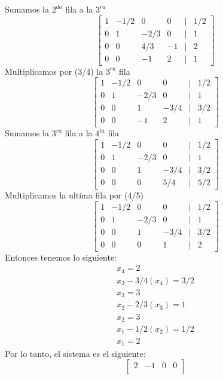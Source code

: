 \begin{itemize}
\[  			\]
  			Sumamos la $2^{da}$ fila a la $3^{ra}$
  			\[
  			\begin{bmatrix}
   			 1 & -1/2 & 0 & 0 & | & 1/2 \\ 
    		 0 & 1 & -2/3 & 0 & | & 1\\
    		 0 & 0 & 4/3 & -1 & | & 2 \\
    		 0 & 0 & -1 & 2 & | & 1 
  			\end{bmatrix}
  			\]
  			Multiplicamos por (3/4) la $3^{ra}$ fila 
			\[
  			\begin{bmatrix}
   			 1 & -1/2 & 0 & 0 & | & 1/2 \\ 
    		 0 & 1 & -2/3 & 0 & | & 1\\
    		 0 & 0 & 1 & -3/4 & | & 3/2 \\
    		 0 & 0 & -1 & 2 & | & 1 
  			\end{bmatrix}
  			\]	
  			Sumamos la $3^{ra}$ fila a la $4^{ta}$ fila 
  			\[
  			\begin{bmatrix}
   			 1 & -1/2 & 0 & 0 & | & 1/2 \\ 
    		 0 & 1 & -2/3 & 0 & | & 1\\
    		 0 & 0 & 1 & -3/4 & | & 3/2 \\
    		 0 & 0 & 0 & 5/4 & | & 5/2 
  			\end{bmatrix}
  			\]	
  			Multiplicamos la ultima fila por (4/5)
  			\[
  			\begin{bmatrix}
   			 1 & -1/2 & 0 & 0 & | & 1/2 \\ 
    		 0 & 1 & -2/3 & 0 & | & 1\\
    		 0 & 0 & 1 & -3/4 & | & 3/2 \\
    		 0 & 0 & 0 & 1 & | & 2 
  			\end{bmatrix}
  			\]	
  			Entonces tenemos lo siguiente:
  			\begin {equation*} \begin {split}  	
				x_{4} = 2 \\
				x_{3} - 3/4(x_{4}) = 3/2 \\
				x_{3} = 3 \\ 
				x_{2} - 2/3(x_{3}) = 1 \\
				x_{2} = 3 \\
				x_{1} - 1/2(x_{2}) = 1/2 \\
				x_{1} = 2 
  			\end {split} \end {equation*}
  			Por lo tanto, el sistema es el siguiente:
  			\[
  			\begin{bmatrix}
    		2 & -1 & 0 & 0 \\

\end{bmatrix}\]
\end{itemize}

